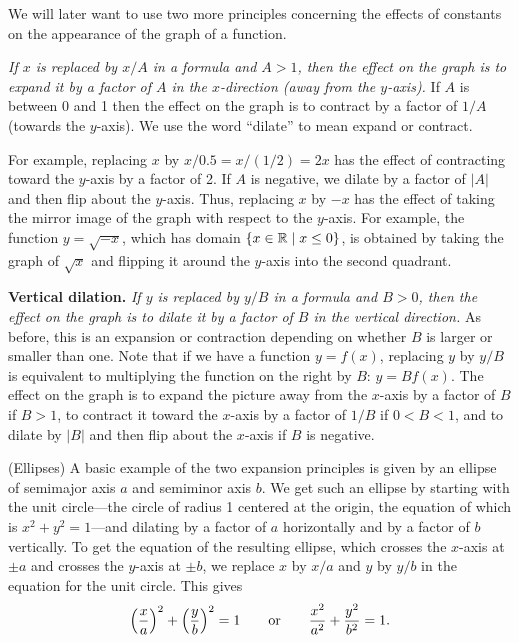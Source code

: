 We will later want to use two more principles concerning the effects of
constants on the appearance of the graph of a function.

\ssk{}  {\it If $x$ is replaced by
$x/A$ in a formula and $A>1$, then the effect on the graph is to
expand it by a factor of $A$ in the $x$-direction (away from the
$y$-axis).} If $A$ is between 0 and
1 then the effect on the graph is to contract by a factor of $1/A$
(towards the $y$-axis). 
We use the word ``dilate'' to mean expand or contract.

For example, replacing $x$ by
$x/0.5=x/(1/2)=2x$ has the effect of contracting toward the $y$-axis by a factor
of 2.  If $A$ is negative, we dilate by a factor of $|A|$ and then
flip about the $y$-axis.  Thus, replacing $x$ by $-x$ has the effect of
taking the mirror image of the graph with respect to the $y$-axis.  For
example, the function $y=\sqrt{-x}$, which has domain 
$\{x\in\mathbb{R}\mid x\le 0\}$, is obtained
by taking the graph of $\sqrt{x}$ and flipping it around the $y$-axis into
the second quadrant.

\smallskip
\noindent
{\bf Vertical dilation.}  {\it If $y$ is replaced by $y/B$ in a formula and
$B>0$, then the effect on the graph is to dilate it by a factor of $B$ in
the vertical direction.} As before, this is an expansion or
contraction depending on whether $B$ is larger or smaller than one.
Note that if we have a function $y=f(x)$,
replacing $y$ by $y/B$ is equivalent to multiplying the function on the
right by $B$: $y=Bf(x)$.  The effect on the graph is to expand the picture
away from the $x$-axis by a factor of $B$ if $B>1$, to contract it toward
the $x$-axis by a factor of $1/B$ if $0<B<1$, and to dilate by $|B|$ and
then flip about the $x$-axis if $B$ is negative.

\begin{example} (Ellipses)
A basic example of the two expansion principles is given by an {\dfont ellipse
of semimajor axis $a$ and semiminor axis $b$}.  We get such an ellipse by
starting with the unit circle---the circle of radius 1 centered at the
origin, the equation of which is $x^2+y^2=1$---and dilating  by a factor
of $a$ horizontally and by a factor of $b$ vertically.  To get the equation
of the resulting
ellipse, which crosses the $x$-axis at $\pm a$ and crosses the $y$-axis
at $\pm b$, we replace $x$ by $x/a$ and $y$ by $y/b$ in the equation
for the unit circle.  This gives 
$$
\left({x\over a}\right)^2+\left({y\over b}\right)^2=1
\qquad\hbox{or}\qquad {x^2\over a^2}+{y^2\over b^2}=1.
$$
\end{example}

